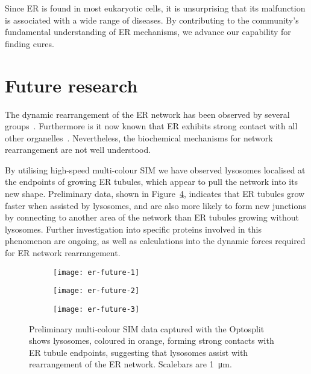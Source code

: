 Since ER is found in most eukaryotic cells, it is unsurprising that its malfunction is associated with a wide range of diseases. 
By contributing to the community's fundamental understanding of ER mechanisms, we advance our capability for finding cures. 

\section{Future research} \label{sec:ERfuture}
The dynamic rearrangement of the ER network has been observed by several groups~\cite{nixon2016increased, pendin2011balancing, yamanaka2018er}. 
Furthermore is it now known that ER exhibits strong contact with all other organelles~\cite{valm2017applying, guo2018visualizing}. 
Nevertheless, the biochemical mechanisms for network rearrangement are not well understood. 

By utilising high-speed multi-colour SIM we have observed lysosomes localised at the endpoints of growing ER tubules, which appear to pull the network into its new shape. 
Preliminary data, shown in Figure~\ref{fig:er-future}, indicates that ER tubules grow faster when assisted by lysosomes, and are also more likely to form new junctions by connecting to another area of the network than ER tubules growing without lysosomes.
Further investigation into specific proteins involved in this phenomenon are ongoing, as well as calculations into the dynamic forces required for ER network rearrangement. 

\begin{figure}[htbp!]
	\centering
		\begin{subfigure}[b]{0.325\textwidth}
		\texttt{[image: er-future-1]}
		\caption{} \label{fig:er-future-1}
	\end{subfigure}	
	\hfill
	\begin{subfigure}[b]{0.325\textwidth}
		\texttt{[image: er-future-2]}
		\caption{} \label{fig:er-future-2}
	\end{subfigure}
	\hfill
	\begin{subfigure}[b]{0.325\textwidth}
		\texttt{[image: er-future-3]}
		\caption{} \label{fig:er-future-3}
	\end{subfigure}
	\caption[ER: Lysosomes form strong contacts with ER tubule endpoints to rearrange the network]{Preliminary multi-colour SIM data captured with the Optosplit shows lysosomes, coloured in orange, forming strong contacts with ER tubule endpoints, suggesting that lysosomes assist with rearrangement of the ER network. Scalebars are \SI{1}{\micro\metre}.}
	\label{fig:er-future}
\end{figure}